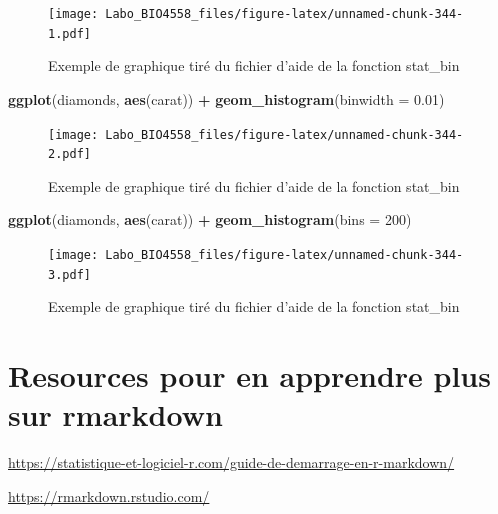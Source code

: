 \documentclass[
  12pt,
]{book}
\newenvironment{Shaded}{\begin{snugshade}}{\end{snugshade}}
\newcommand{\DataTypeTok}[1]{\textcolor[rgb]{0.13,0.29,0.53}{#1}}
\newcommand{\DecValTok}[1]{\textcolor[rgb]{0.00,0.00,0.81}{#1}}
\newcommand{\FloatTok}[1]{\textcolor[rgb]{0.00,0.00,0.81}{#1}}
\newcommand{\KeywordTok}[1]{\textcolor[rgb]{0.13,0.29,0.53}{\textbf{#1}}}
\newcommand{\NormalTok}[1]{#1}
\newcommand{\OperatorTok}[1]{\textcolor[rgb]{0.81,0.36,0.00}{\textbf{#1}}}
\newcommand{\StringTok}[1]{\textcolor[rgb]{0.31,0.60,0.02}{#1}}
\begin{document}
\begin{figure}
\centering
\texttt{[image: Labo\_BIO4558\_files/figure-latex/unnamed-chunk-344-1.pdf]}
\caption{\label{fig:unnamed-chunk-344-1}Exemple de graphique tiré du fichier d'aide de la fonction stat\_bin}
\end{figure}

\begin{Shaded}
\begin{Highlighting}[]
\KeywordTok{ggplot}\NormalTok{(diamonds, }\KeywordTok{aes}\NormalTok{(carat)) }\OperatorTok{+}
\StringTok{  }\KeywordTok{geom\_histogram}\NormalTok{(}\DataTypeTok{binwidth =} \FloatTok{0.01}\NormalTok{)}
\end{Highlighting}
\end{Shaded}

\begin{figure}
\centering
\texttt{[image: Labo\_BIO4558\_files/figure-latex/unnamed-chunk-344-2.pdf]}
\caption{\label{fig:unnamed-chunk-344-2}Exemple de graphique tiré du fichier d'aide de la fonction stat\_bin}
\end{figure}

\begin{Shaded}
\begin{Highlighting}[]
\KeywordTok{ggplot}\NormalTok{(diamonds, }\KeywordTok{aes}\NormalTok{(carat)) }\OperatorTok{+}
\StringTok{  }\KeywordTok{geom\_histogram}\NormalTok{(}\DataTypeTok{bins =} \DecValTok{200}\NormalTok{)}
\end{Highlighting}
\end{Shaded}

\begin{figure}
\centering
\texttt{[image: Labo\_BIO4558\_files/figure-latex/unnamed-chunk-344-3.pdf]}
\caption{\label{fig:unnamed-chunk-344-3}Exemple de graphique tiré du fichier d'aide de la fonction stat\_bin}
\end{figure}

\hypertarget{resources-pour-en-apprendre-plus-sur-rmarkdown}{%
\chapter{Resources pour en apprendre plus sur rmarkdown}\label{resources-pour-en-apprendre-plus-sur-rmarkdown}}

\url{https://statistique-et-logiciel-r.com/guide-de-demarrage-en-r-markdown/}

\url{https://rmarkdown.rstudio.com/}

\printindex
\end{document}
